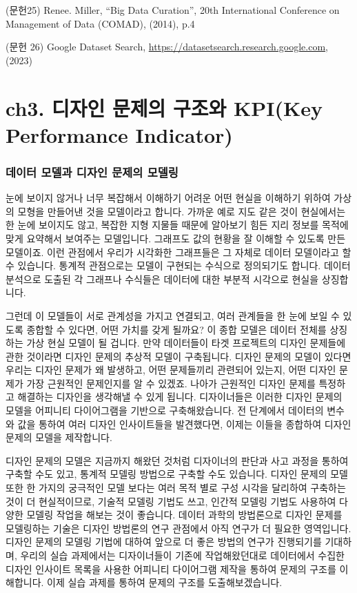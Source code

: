 \documentclass[
  letterpaper,
]{book}
\begin{document}
(문헌25) Renee. Miller, ``Big Data Curation'', 20th International
Conference on Management of Data (COMAD), (2014), p.4

(문헌 26) Google Dataset Search,
\url{https://datasetsearch.research.google.com}, (2023)

\chapter{ch3. 디자인 문제의 구조와 KPI(Key Performance
Indicator)}\label{ch3.-uxb514uxc790uxc778-uxbb38uxc81cuxc758-uxad6cuxc870uxc640-kpikey-performance-indicator}

\subsection{데이터 모델과 디자인 문제의
모델링}\label{uxb370uxc774uxd130-uxbaa8uxb378uxacfc-uxb514uxc790uxc778-uxbb38uxc81cuxc758-uxbaa8uxb378uxb9c1}

눈에 보이지 않거나 너무 복잡해서 이해하기 어려운 어떤 현실을 이해하기
위하여 가상의 모형을 만들어낸 것을 모델이라고 합니다. 가까운 예로 지도
같은 것이 현실에서는 한 눈에 보이지도 않고, 복잡한 지형 지물들 때문에
알아보기 힘든 지리 정보를 목적에 맞게 요약해서 보여주는 모델입니다.
그래프도 값의 현황을 잘 이해할 수 있도록 만든 모델이죠. 이런 관점에서
우리가 시각화한 그래프들은 그 자체로 데이터 모델이라고 할 수 있습니다.
통계적 관점으로는 모델이 구현되는 수식으로 정의되기도 합니다. 데이터
분석으로 도출된 각 그래프나 수식들은 데이터에 대한 부분적 시각으로
현실을 상징합니다.

그런데 이 모델들이 서로 관계성을 가지고 연결되고, 여러 관계들을 한 눈에
보일 수 있도록 종합할 수 있다면, 어떤 가치를 갖게 될까요? 이 종합 모델은
데이터 전체를 상징하는 가상 현실 모델이 될 겁니다. 만약 데이터들이 타겟
프로젝트의 디자인 문제들에 관한 것이라면 디자인 문제의 추상적 모델이
구축됩니다. 디자인 문제의 모델이 있다면 우리는 디자인 문제가 왜
발생하고, 어떤 문제들끼리 관련되어 있는지, 어떤 디자인 문제가 가장
근원적인 문제인지를 알 수 있겠죠. 나아가 근원적인 디자인 문제를 특정하고
해결하는 디자인을 생각해낼 수 있게 됩니다. 디자이너들은 이러한 디자인
문제의 모델을 어피니티 다이어그램을 기반으로 구축해왔습니다. 전 단계에서
데이터의 변수와 값을 통하여 여러 디자인 인사이트들을 발견했다면, 이제는
이들을 종합하여 디자인 문제의 모델을 제작합니다.

디자인 문제의 모델은 지금까지 해왔던 것처럼 디자이너의 판단과 사고
과정을 통하여 구축할 수도 있고, 통계적 모델링 방법으로 구축할 수도
있습니다. 디자인 문제의 모델 또한 한 가지의 궁극적인 모델 보다는 여러
목적 별로 구성 시각을 달리하여 구축하는 것이 더 현실적이므로, 기술적
모델링 기법도 쓰고, 인간적 모델링 기법도 사용하여 다양한 모델링 작업을
해보는 것이 좋습니다. 데이터 과학의 방법론으로 디자인 문제를 모델링하는
기술은 디자인 방법론의 연구 관점에서 아직 연구가 더 필요한 영역입니다.
디자인 문제의 모델링 기법에 대하여 앞으로 더 좋은 방법의 연구가
진행되기를 기대하며, 우리의 실습 과제에서는 디자이너들이 기존에
작업해왔던대로 데이터에서 수집한 디자인 인사이트 목록을 사용한 어피니티
다이어그램 제작을 통하여 문제의 구조를 이해합니다. 이제 실습 과제를
통하여 문제의 구조를 도출해보겠습니다.
\end{document}
